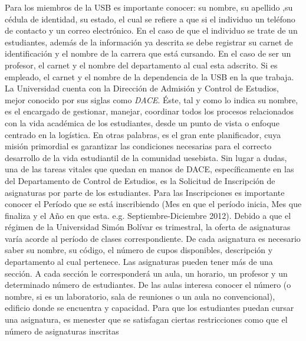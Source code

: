 \documentclass[12pt,a4paper,spanish]{article}
\begin{document}
\indent Para los miembros de la USB es importante conocer: su nombre, su apellido ,su c\'edula
de identidad, su estado, el cual se refiere a que si el individuo un
tel\'efono de contacto y un correo electr\'onico. En el caso de que el individuo se trate de un estudiantes, adem\'as
de la informaci\'on ya descrita se debe registrar su carnet de identificaci\'on y el nombre de la carrera que est\'a cursando. En el caso de ser un 
profesor, el carnet y el nombre del departamento al cual esta adscrito. Si es empleado, el carnet y el nombre de la dependencia de la USB en la que trabaja. 
\newline
\newline 
\indent La Universidad cuenta con la Direcci\'on de Admisi\'on y
Control de Estudios, mejor conocido por sus siglas como
\emph{DACE}. \'Este, tal y como lo indica su nombre, es el encargado
de gestionar, manejar, coordinar todos los procesos relacionados con
la vida acad\'emica de los estudiantes, desde un punto de vista o
enfoque centrado en la log\'istica. En otras palabras, es el gran ente
planificador, cuya misi\'on primordial es garantizar las condiciones
necesarias para el correcto desarrollo de la vida estudiantil de la
comunidad uesebista. Sin lugar a dudas, una de las tareas vitales que
quedan en manos de DACE, espec\'ificamente en las del Departamento de
Control de Estudios, es la Solicitud de Inscripci\'on de asignaturas
por parte de los estudiantes. Para las Inscripciones es importante
conocer el Per\'iodo que se est\'a inscribiendo (Mes en que el
per\'iodo inicia, Mes que finaliza y el A\~no en que
esta. e.g. Septiembre-Diciembre 2012).
\newline
\newline
\indent Debido a que el r\'egimen de la Universidad Sim\'on Bol\'ivar es
trimestral, la oferta de asignaturas var\'ia acorde al per\'iodo de
clases correspondiente. De cada asignatura es necesario saber su
nombre, su c\'odigo, el n\'umero de cupos disponibles, descripci\'on y
departamento al cual pertenece. Las asignaturas pueden tener m\'as de
una secci\'on. A cada secci\'on le corresponder\'a un aula, un horario,
un profesor y un determinado n\'umero de estudiantes. De las aulas interesa conocer el n\'umero (o nombre, si es un laboratorio, sala de reuniones o un aula no convencional), edificio donde se encuentra y capacidad. 
\newline
\newline	
\indent Para que los estudiantes puedan cursar una asignatura, es menester que se satisfagan ciertas restricciones como que el n\'umero de asignaturas inscritas 
\end{document}
